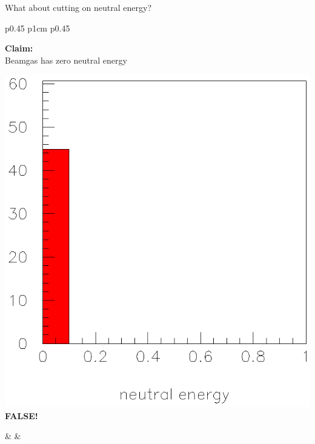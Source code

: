 

\begin{slide*}

\slideframe{}
\huge
{}

\begin{minipage}[t]{\linewidth}
\large

{\huge What about cutting on neutral energy?}

\begin{center}
\begin{tabular}{p{0.45\linewidth} p{1cm} p{0.45\linewidth}}
  \begin{minipage}{\linewidth}
    \begin{center}
      \begin{minipage}{0.95\linewidth}
        {\bf Claim:} \\ Beamgas has zero neutral energy \\
      \end{minipage}
      \includegraphics[width=0.75\linewidth]{neutral_energy2.eps} \\
      {\Large \bf FALSE!}
    \end{center}
  \end{minipage} & &
  \begin{minipage}{\linewidth}
    \begin{center}

\end{center}
\end{minipage}
\end{tabular}
\end{center}
\end{minipage}
\end{slide*}
